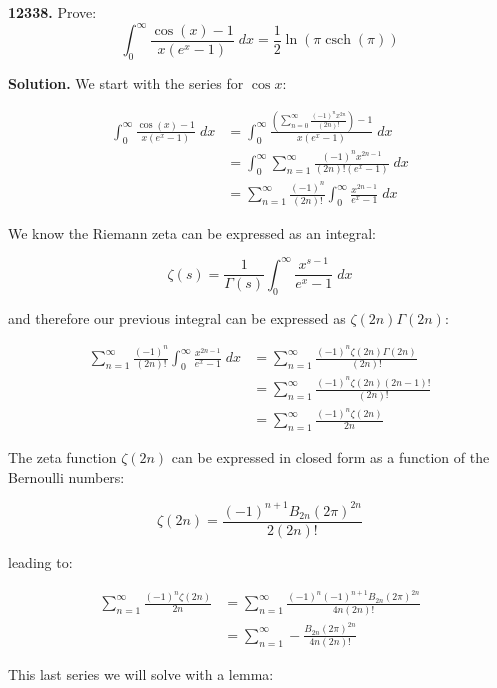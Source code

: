 \documentclass{letter}
\DeclareMathOperator{\csch}{csch}
\begin{document}
\newtheorem{lemma}{Lemma}

\begin{letter}{}
  \textbf{12338.} Prove:
  $$\int_0^\infty\frac{\cos\left(x\right)-1}{x\left(e^x-1\right)}\;dx
    = \frac{1}{2}\ln\left(\pi\csch\left(\pi\right)\right)$$

  \textbf{Solution.} We start with the series for $\cos x$:

\begin{align*}
  \int_0^\infty\frac{\cos\left(x\right)-1}{x\left(e^x-1\right)}\;dx
    &= \int_0^\infty\frac{\left(\sum_{n=0}^\infty\frac{(-1)^n x^{2n}}{(2n)!}
    \right)-1}{x\left(e^x-1\right)}\;dx \\
    &= \int_0^\infty\sum_{n=1}^\infty
      \frac{(-1)^n x^{2n-1}}{(2n)!\left(e^x-1\right)}\;dx \\
    &= \sum_{n=1}^\infty\frac{(-1)^n}{(2n)!}\int_0^\infty
      \frac{x^{2n-1}}{e^x-1}\;dx 
\end{align*}

We know the Riemann zeta can be expressed as an integral:

$$\zeta(s)=\frac{1}{\Gamma(s)}\int_0^\infty\frac{x^{s-1}}{e^x-1}\;dx$$

and therefore our previous integral can be expressed as $\zeta(2n)\Gamma(2n)$:

\begin{align*}
  \sum_{n=1}^\infty\frac{(-1)^n}{(2n)!}\int_0^\infty
      \frac{x^{2n-1}}{e^x-1}\;dx 
  &= \sum_{n=1}^\infty\frac{(-1)^n\zeta(2n)\Gamma(2n)}{(2n)!}\\
  &= \sum_{n=1}^\infty\frac{(-1)^n\zeta(2n)(2n-1)!}{(2n)!}\\
  &= \sum_{n=1}^\infty\frac{(-1)^n\zeta(2n)}{2n}
\end{align*}

The zeta function $\zeta(2n)$ can be expressed in closed form as a function of the Bernoulli numbers:

$$\zeta(2n)=\frac{(-1)^{n+1}B_{2n}(2\pi)^{2n}}{2(2n)!}$$

leading to:

\begin{align*}
  \sum_{n=1}^\infty\frac{(-1)^n\zeta(2n)}{2n} &= 
    \sum_{n=1}^\infty\frac{(-1)^n(-1)^{n+1}B_{2n}(2\pi)^{2n}}{4n(2n)!} \\
  &= \sum_{n=1}^\infty-\frac{B_{2n}(2\pi)^{2n}}{4n(2n)!}
\end{align*}

This last series we will solve with a lemma:


\end{letter}
\end{document}
